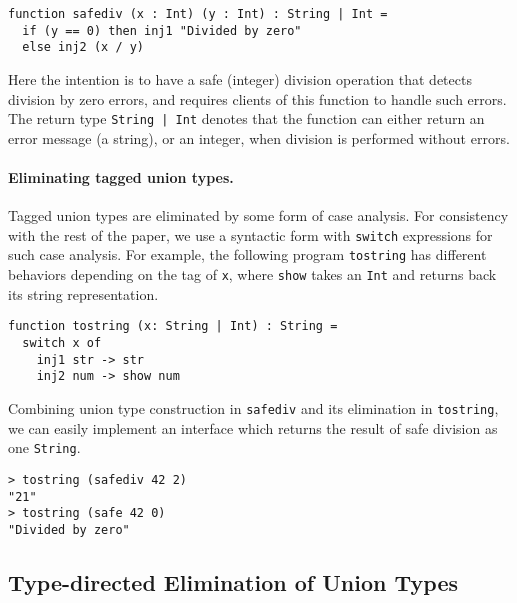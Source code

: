 \begin{lstlisting}
function safediv (x : Int) (y : Int) : String | Int =
  if (y == 0) then inj1 "Divided by zero"
  else inj2 (x / y)
\end{lstlisting}

\noindent Here the intention is to have a safe (integer) division operation that detects
division by zero errors, and requires clients of this function to handle
such errors. The return type \lstinline{String | Int} denotes that the function
can either return an error message (a string), or an integer, when division
is performed without errors.

\paragraph{Eliminating tagged union types.}
Tagged union types are eliminated by some form of case analysis.
For consistency with the rest of the paper, we use a syntactic form with
\lstinline{switch} expressions for such case analysis. For example,
the following program \lstinline{tostring} has different behaviors depending on the
tag of \lstinline{x}, where \lstinline{show} takes an \lstinline{Int} and
returns back its string representation.

\begin{lstlisting}
function tostring (x: String | Int) : String =
  switch x of
    inj1 str -> str
    inj2 num -> show num
\end{lstlisting}

Combining union type construction in \lstinline{safediv} and its elimination in
\lstinline{tostring}, we can easily implement an interface which returns the
result of safe division as one \lstinline{String}.

\begin{lstlisting}
> tostring (safediv 42 2)
"21"
> tostring (safe 42 0)
"Divided by zero"
\end{lstlisting}


\subsection{Type-directed Elimination of Union Types}\label{subsec:elimination}


